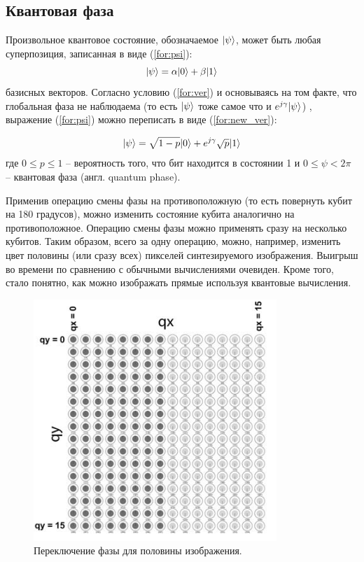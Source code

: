 \subsection{Квантовая фаза}

Произвольное квантовое состояние, обозначаемое $\lvert\psi\rangle$, может быть любая суперпозиция, записанная в виде (\ref{for:psi}):
\begin{equation}
	\label{for:psi}
	\lvert\psi\rangle = \alpha\lvert0\rangle + \beta\lvert1\rangle
\end{equation}
 базисных векторов. Согласно условию (\ref{for:ver}) и основываясь на том факте, что глобальная фаза не наблюдаема (то есть $\lvert\psi\rangle$ тоже самое что и $e^{j\gamma}\lvert\psi\rangle$) \cite{global-phase}, выражение (\ref{for:psi}) можно переписать в виде (\ref{for:new_ver}):
 
\begin{equation} 
	\label{for:new_ver}
	\lvert\psi\rangle = \sqrt{1 - p}\lvert0\rangle + e^{j\gamma}\sqrt{p}\lvert1\rangle
\end{equation} где $0 \leq p \leq 1$ -- вероятность того, что бит находится в состоянии 1 и $0 \leq \psi < 2\pi$ -- квантовая фаза (англ. quantum phase).

Применив операцию смены фазы на противоположную (то есть повернуть кубит на 180 градусов), можно изменить состояние кубита аналогично на противоположное. Операцию смены фазы можно применять сразу на несколько кубитов. Таким образом, всего за одну операцию, можно, например, изменить цвет половины (или сразу всех) пикселей синтезируемого изображения. Выигрыш во времени по сравнению с обычными вычислениями очевиден. Кроме того, стало понятно, как можно изображать прямые используя квантовые вычисления. 

\begin{figure}[h]
	\begin{center}
		\includegraphics[scale=0.7]{img/holst_02.png}
	\end{center}
	\captionsetup{justification=centering}
	\caption{Переключение фазы для половины изображения.}
	\label{img:holst_02}
\end{figure}


